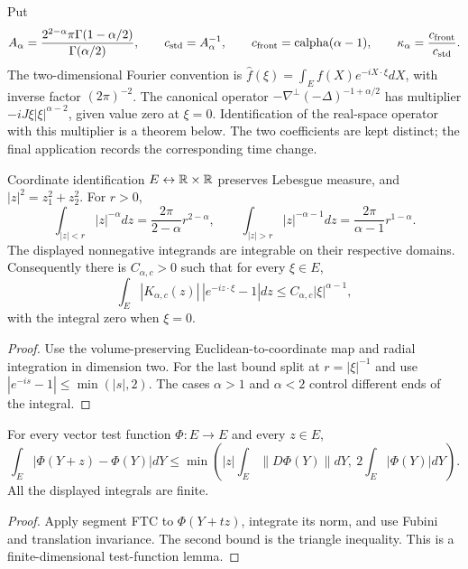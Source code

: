 \begin{definition}
  \label{def:c13_normalization}
  Put
  \[
    A_\alpha=\frac{2^{2-\alpha}\pi\Gamma(1-\alpha/2)}{\Gamma(\alpha/2)},\qquad
    c_{\rm std}=A_\alpha^{-1},\qquad c_{\rm front}=\operatorname{calpha}(\alpha-1),\qquad
    \kappa_\alpha=\frac{c_{\rm front}}{c_{\rm std}}.
  \]
  The two-dimensional Fourier convention is
  $\widehat f(\xi)=\int_E f(X)e^{-iX\cdot\xi}dX$, with inverse factor $(2\pi)^{-2}$.
  The canonical operator $-\nabla^\perp(-\Delta)^{-1+\alpha/2}$ has multiplier
  $-iJ\xi|\xi|^{\alpha-2}$, given value zero at $\xi=0$.
  Identification of the real-space operator with this multiplier is a theorem below.
  The two coefficients are kept distinct; the final application records the corresponding time change.
\end{definition}

\begin{lemma}
  \label{lem:c13_radial_majorants}
  Coordinate identification $E\leftrightarrow\mathbb{R}\times\mathbb{R}$ preserves Lebesgue measure, and
  $|z|^2=z_1^2+z_2^2$. For $r>0$,
  \[
    \int_{|z|<r}|z|^{-\alpha}dz=\frac{2\pi}{2-\alpha}r^{2-\alpha},\qquad
    \int_{|z|>r}|z|^{-\alpha-1}dz=\frac{2\pi}{\alpha-1}r^{1-\alpha}.
  \]
  The displayed nonnegative integrands are integrable on their respective domains.
  Consequently there is $C_{\alpha,c}>0$ such that for every $\xi\in E$,
  \[
    \int_E|K_{\alpha,c}(z)|\,|e^{-iz\cdot\xi}-1|dz
       \le C_{\alpha,c}|\xi|^{\alpha-1},
  \]
  with the integral zero when $\xi=0$.
\end{lemma}
\begin{proof}
  Use the volume-preserving Euclidean-to-coordinate map and radial integration in dimension two.
  For the last bound split at $r=|\xi|^{-1}$ and use $|e^{-is}-1|\le\min(|s|,2)$.
  The cases $\alpha>1$ and $\alpha<2$ control different ends of the integral.
\end{proof}

\begin{lemma}
  \label{lem:c13_test_translation}
  For every vector test function $\Phi:E\to E$ and every $z\in E$,
  \[
    \int_E|\Phi(Y+z)-\Phi(Y)|dY
       \le\min\left(|z|\int_E\|D\Phi(Y)\|dY,\ 2\int_E|\Phi(Y)|dY\right).
  \]
  All the displayed integrals are finite.
\end{lemma}
\begin{proof}
  Apply segment FTC to $\Phi(Y+tz)$, integrate its norm, and use Fubini and translation invariance.
  The second bound is the triangle inequality. This is a finite-dimensional test-function lemma.
\end{proof}

